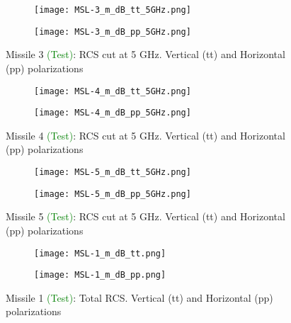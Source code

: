   \begin{figure}[htbp]
    \centering
    \begin{subfigure}{.5\textwidth}
      \centering
      \texttt{[image: MSL-3\_m\_dB\_tt\_5GHz.png]}
    \end{subfigure}%
    \begin{subfigure}{.5\textwidth}
      \centering
      \texttt{[image: MSL-3\_m\_dB\_pp\_5GHz.png]}
    \end{subfigure}
    \caption{Missile 3 \textcolor{green}{(Test)}:  RCS cut at 5 GHz. Vertical (tt) and Horizontal (pp) polarizations }
    \label{fig:n3}
  \end{figure}

  \begin{figure}[htbp]
    \centering
    \begin{subfigure}{.5\textwidth}
      \centering
      \texttt{[image: MSL-4\_m\_dB\_tt\_5GHz.png]}
    \end{subfigure}%
    \begin{subfigure}{.5\textwidth}
      \centering
      \texttt{[image: MSL-4\_m\_dB\_pp\_5GHz.png]}
    \end{subfigure}
    \caption{Missile 4 \textcolor{green}{(Test)}:  RCS cut at 5 GHz. Vertical (tt) and Horizontal (pp) polarizations }
    \label{fig:n4}
  \end{figure}

  \begin{figure}[htbp]
    \centering
    \begin{subfigure}{.5\textwidth}
      \centering
      \texttt{[image: MSL-5\_m\_dB\_tt\_5GHz.png]}
    \end{subfigure}%
    \begin{subfigure}{.5\textwidth}
      \centering
      \texttt{[image: MSL-5\_m\_dB\_pp\_5GHz.png]}
    \end{subfigure}
    \caption{Missile 5 \textcolor{green}{(Test)}:  RCS cut at 5 GHz. Vertical (tt) and Horizontal (pp) polarizations }
    \label{fig:n5}
  \end{figure}

  \begin{figure}[htbp]
    \centering
    \begin{subfigure}{.5\textwidth}
      \centering
      \texttt{[image: MSL-1\_m\_dB\_tt.png]}
    \end{subfigure}%
    \begin{subfigure}{.5\textwidth}
      \centering
      \texttt{[image: MSL-1\_m\_dB\_pp.png]}
    \end{subfigure}
    \caption{Missile 1 \textcolor{green}{(Test)}:  Total RCS. Vertical (tt) and Horizontal (pp) polarizations }
    \label{fig:c1}
  \end{figure}

